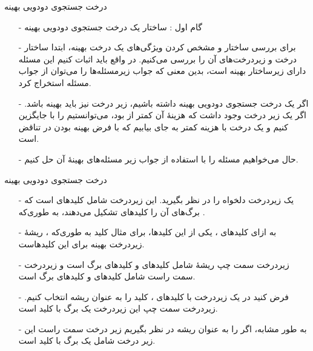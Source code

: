 \begin{frame}{‌درخت جستجوی دودویی بهینه}
\begin{itemize}\itemr
\item[-]
گام اول : ساختار یک درخت جستجوی دودویی بهینه
\item[-]
برای بررسی ساختار و مشخص کردن ویژگی‌های یک درخت بهینه، ابتدا ساختار درخت و زیردرخت‌های آن را بررسی می‌کنیم.
در واقع باید اثبات کنیم این مسئله دارای زیرساختار بهینه است، بدین معنی که جواب زیرمسئله‌ها را می‌توان از جواب مسئله استخراج کرد.
\item[-]
اگر یک درخت جستجوی دودویی بهینه
داشته باشیم، زیر درخت
نیز باید بهینه باشد. اگر یک زیر درخت
وجود داشت که هزینهٔ آن کمتر از
بود، می‌توانستیم
را با
جایگزین کنیم و یک درخت با هزینه کمتر به جای
بیابیم که با فرض بهینه بودن
در تناقض است.
\item[-]
حال می‌خواهیم مسئله را با استفاده از جواب زیر مسئله‌های بهینهٔ آن حل کنیم.
\end{itemize}
\end{frame}


\begin{frame}{‌درخت جستجوی دودویی بهینه}
\begin{itemize}\itemr
\item[-]
یک زیردرخت دلخواه را در نظر بگیرید. این زیردرخت شامل کلیدهای
است
که برگ‌های آن را کلیدهای
تشکیل می‌دهند، به طوری‌که
 .
\item[-]
به ازای کلیدهای
، یکی از این کلیدها، برای مثال کلید
به طوری‌که
، ریشهٔ زیردرخت بهینه برای این کلیدهاست.
\item[-]
زیردرخت سمت چپ ریشهٔ
شامل کلیدهای
و کلیدهای برگ
است و زیردرخت سمت راست شامل کلیدهای
و کلیدهای برگ
است.
\item[-]
فرض کنید در یک زیردرخت با کلیدهای
، کلید
را به عنوان ریشه انتخاب کنیم. 
زیردرخت سمت چپ این زیردرخت یک برگ با کلید
است.
\item[-]
به طور مشابه، اگر
را به عنوان ریشه در نظر بگیریم زیر درخت سمت راست این زیر درخت شامل یک برگ با کلید
است.
\end{itemize}
\end{frame}


